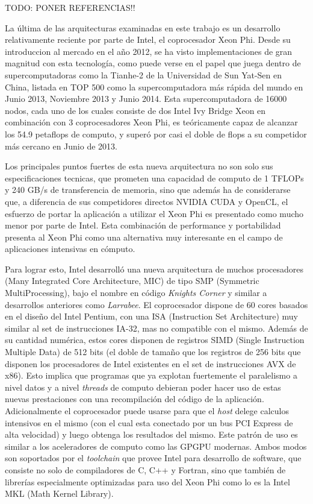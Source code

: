 TODO: PONER REFERENCIAS!!

La última de las arquitecturas examinadas en este trabajo es un desarrollo relativamente reciente
por parte de Intel, el coprocesador Xeon Phi. Desde su introduccion al mercado en el a\~no 2012, se ha visto implementaciones de gran magnitud con esta tecnología, como puede verse en el papel
que juega dentro de supercomputadoras como la Tianhe-2 de la Universidad de Sun Yat-Sen en China,
listada en TOP 500 como la supercomputadora más rápida del mundo en Junio 2013, Noviembre 2013 y
Junio 2014. Esta supercomputadora de 16000 nodos, cada uno de los cuales consiste de dos Intel
Ivy Bridge Xeon en combinación con 3 coprocesadores Xeon Phi, es teóricamente capaz de alcanzar los
54.9 petaflops de computo, y superó por casi el doble de flops a su competidor más cercano en
Junio de 2013.

Los principales puntos fuertes de esta nueva arquitectura no son solo sus especificaciones tecnicas, que prometen una
capacidad de computo de 1 TFLOPs y 240 GB/s de transferencia de memoria, sino que además ha de considerarse
que, a diferencia de sus competidores directos NVIDIA CUDA y OpenCL, el esfuerzo de portar la aplicación a utilizar
el Xeon Phi es presentado como mucho menor por parte de Intel. Esta combinación de performance y portabilidad
presenta al Xeon Phi como una alternativa muy interesante en el campo de aplicaciones intensivas en cómputo.

Para lograr esto, Intel desarroll\'o una nueva arquitectura de muchos procesadores (Many Integrated Core Architecture, MIC) de
tipo SMP (Symmetric MultiProcessing), bajo el nombre en código \textit{Knights Corner} y similar a desarrollos anteriores como \textit{Larrabee}. El coprocesador dispone de 60 cores basados
en el dise\~no del Intel Pentium, con una ISA (Instruction Set Architecture) muy similar al set de instrucciones IA-32, mas no compatible con el mismo. Además de su cantidad
numérica, estos cores disponen de registros SIMD (Single Instruction Multiple Data) de 512 bits (el doble de tamaño que los registros de 256
bits que disponen los procesadores de Intel existentes en el set de instrucciones AVX de x86). Esto implica que programas
que ya explotan fuertemente el paralelismo a nivel datos y a nivel \textit{threads} de computo debieran poder hacer uso de
estas nuevas prestaciones con una recompilación del c\'odigo de la aplicaci\'on. Adicionalmente el coprocesador puede usarse para que el
\textit{host} delege calculos intensivos en el mismo (con el cual esta conectado por un bus
PCI Express de alta velocidad) y luego obtenga los resultados del mismo. Este patr\'on de uso es similar a los aceleradores de computo como las GPGPU modernas. Ambos modos son soportados por el \textit{toolchain} que provee
Intel para desarrollo de software, que consiste no solo de compiladores de C, C++ y Fortran, sino que también de librerías especialmente optimizadas para uso del Xeon Phi
como lo es la Intel MKL (Math Kernel Library).

